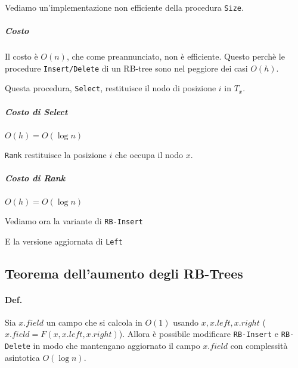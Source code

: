 \begin{center}
\end{center}

Vediamo un'implementazione non efficiente della procedura \texttt{Size}.

 

\subparagraph{Costo} Il costo è $O(n)$, che come preannunciato, non è efficiente.
Questo perchè le procedure \texttt{Insert/Delete} di un RB-tree sono nel peggiore dei casi $O(h)$.

\bigskip Questa procedura, \texttt{Select}, restituisce il nodo di posizione $i$
in $T_x$.

 

\subparagraph{Costo di Select} $O(h) = O(\log n)$

\texttt{Rank} restituisce la posizione $i$ che occupa il nodo $x$.



\subparagraph{Costo di Rank} $O(h) = O(\log n)$

\bigskip Vediamo ora la variante di \texttt{RB-Insert} 



E la versione aggiornata di \texttt{Left}



\subsection{Teorema dell'aumento degli RB-Trees}

\paragraph{Def.} Sia $x.field$ un campo che si calcola in $O(1)$
usando $x, x.left, x.right$ ($x.field = F(x, x.left, x.right)$).
Allora è possibile modificare \texttt{RB-Insert} e \texttt{RB-Delete}
in modo che mantengano aggiornato il campo $x.field$ con complessità
asintotica $O(\log n)$.